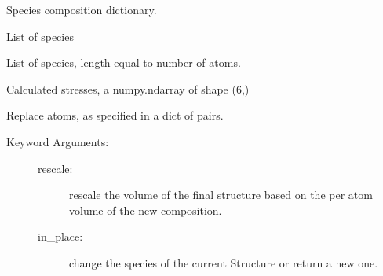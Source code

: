 \documentclass[letterpaper,10pt,english]{sphinxmanual}
\begin{document}
\begin{fulllineitems}
\begin{fulllineitems}
\end{fulllineitems}


\begin{fulllineitems}
\label{models:qmpy.Structure.spec_comp}
Species composition dictionary.

\end{fulllineitems}


\begin{fulllineitems}
\label{models:qmpy.Structure.species}
List of species

\end{fulllineitems}


\begin{fulllineitems}
\label{models:qmpy.Structure.species_types}
List of species, length equal to number of atoms.

\end{fulllineitems}


\begin{fulllineitems}
\label{models:qmpy.Structure.stresses}
Calculated stresses, a numpy.ndarray of shape (6,)

\end{fulllineitems}


\begin{fulllineitems}
\label{models:qmpy.Structure.sub}
Replace atoms, as specified in a dict of pairs.
\begin{description}
\item[{Keyword Arguments:}] \leavevmode\begin{description}
\item[{rescale: }] \leavevmode
rescale the volume of the final structure based on the per 
atom volume of the new composition.

\item[{in\_place: }] \leavevmode
change the species of the current Structure or return a new 
one.


\end{description}
\end{description}
\end{fulllineitems}
\end{fulllineitems}
\end{document}
